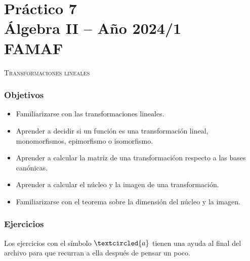 \chapter*{ Práctico 7 \\ Álgebra  II -- Año 2024/1 \\ FAMAF}\label{practico-7}

    

\centerline{\textsc{Transformaciones lineales}}

\subsection*{Objetivos}

\begin{itemize}
 \item Familiarizarse con las transformaciones lineales.
 \item Aprender a decidir si un función es una transformación lineal, monomorfismos, epimorfismo o isomorfismo.
 \item Aprender a calcular la matriz de una transformaci\'con respecto a las bases canónicas.
 \item Aprender a calcular el núcleo y la imagen de una transformación.

 \item Familiarizarse con el teorema sobre la dimensión del núcleo y la imagen.
\end{itemize}



\subsection*{Ejercicios} Los ejercicios con el símbolo $\textcircled{a}$ tienen una ayuda al final del archivo para que recurran a ella después de pensar un poco.

